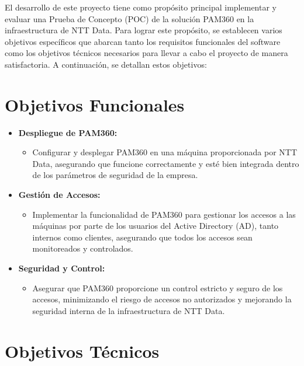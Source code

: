 
El desarrollo de este proyecto tiene como propósito principal implementar y evaluar una Prueba de Concepto (POC) de la solución PAM360 en la infraestructura de NTT Data. Para lograr este propósito, se establecen varios objetivos específicos que abarcan tanto los requisitos funcionales del software como los objetivos técnicos necesarios para llevar a cabo el proyecto de manera satisfactoria. A continuación, se detallan estos objetivos:

\section{Objetivos Funcionales}

\begin{itemize}
	\item \textbf{Despliegue de PAM360:}
	\begin{itemize}
		\item Configurar y desplegar PAM360 en una máquina proporcionada por NTT Data, asegurando que funcione correctamente y esté bien integrada dentro de los parámetros de seguridad de la empresa.
	\end{itemize}
	
	\item \textbf{Gestión de Accesos:}
	\begin{itemize}
		\item Implementar la funcionalidad de PAM360 para gestionar los accesos a las máquinas por parte de los usuarios del Active Directory (AD), tanto internos como clientes, asegurando que todos los accesos sean monitoreados y controlados.
	\end{itemize}
	
	\item \textbf{Seguridad y Control:}
	\begin{itemize}
		\item Asegurar que PAM360 proporcione un control estricto y seguro de los accesos, minimizando el riesgo de accesos no autorizados y mejorando la seguridad interna de la infraestructura de NTT Data.
	\end{itemize}
\end{itemize}

\section{Objetivos Técnicos}

